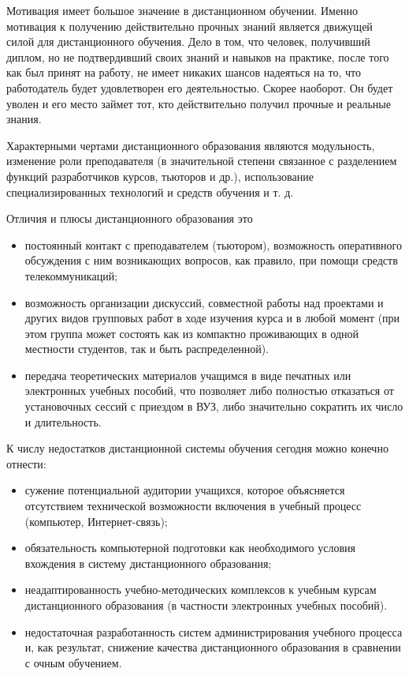 Мотивация имеет большое значение в дистанционном обучении. Именно мотивация к получению действительно прочных знаний
является движущей силой для дистанционного обучения. Дело в том, что человек, получивший диплом,
но не подтвердивший своих знаний и навыков на практике, после того как был принят на работу,
не имеет никаких шансов надеяться на то, что работодатель будет удовлетворен его деятельностью.
Скорее наоборот. Он будет уволен и его место займет тот, кто действительно получил прочные и
реальные знания.

Характерными чертами дистанционного образования являются модульность, изменение роли
преподавателя (в значительной степени связанное с разделением функций разработчиков курсов,
тьюторов и др.), использование специализированных технологий и средств обучения и т. д.

Отличия и плюсы дистанционного образования это
\begin{itemize}
  \item постоянный контакт с преподавателем (тьютором), возможность оперативного обсуждения с ним
  возникающих вопросов, как правило, при помощи средств телекоммуникаций;
  \item возможность организации дискуссий, совместной работы над проектами и других видов групповых
  работ в ходе изучения курса и в любой момент (при этом группа может состоять как
  из компактно проживающих в одной местности студентов, так и быть распределенной).
  \item передача теоретических материалов учащимся в виде печатных или электронных учебных пособий,
  что позволяет либо полностью отказаться от установочных сессий с приездом в ВУЗ, либо
  значительно сократить их число и длительность.
\end{itemize}

К числу недостатков дистанционной системы обучения сегодня можно конечно отнести:
\begin{itemize}
  \item сужение потенциальной аудитории учащихся, которое объясняется отсутствием технической
  возможности включения в учебный процесс (компьютер, Интернет-связь);
  \item обязательность компьютерной подготовки как необходимого условия вхождения в систему
  дистанционного образования;
  \item неадаптированность учебно-методических комплексов к
  учебным курсам дистанционного образования (в частности электронных учебных пособий).
  \item недостаточная разработанность систем администрирования учебного процесса и, как результат,
  снижение качества дистанционного образования в сравнении с очным обучением.
\end{itemize}

